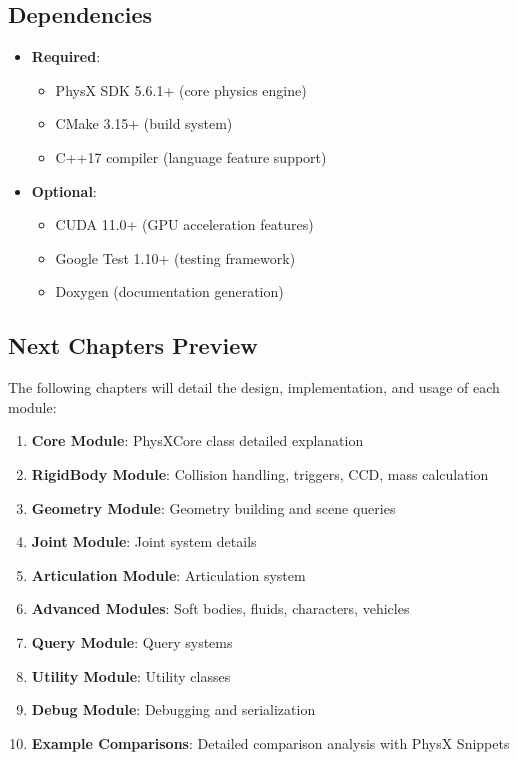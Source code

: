 \subsection{Dependencies}

\begin{itemize}
    \item \textbf{Required}:
    \begin{itemize}
        \item PhysX SDK 5.6.1+ (core physics engine)
        \item CMake 3.15+ (build system)
        \item C++17 compiler (language feature support)
    \end{itemize}

    \item \textbf{Optional}:
    \begin{itemize}
        \item CUDA 11.0+ (GPU acceleration features)
        \item Google Test 1.10+ (testing framework)
        \item Doxygen (documentation generation)
    \end{itemize}
\end{itemize}

\subsection{Next Chapters Preview}

The following chapters will detail the design, implementation, and usage of each module:

\begin{enumerate}
    \item \textbf{Core Module}: PhysXCore class detailed explanation
    \item \textbf{RigidBody Module}: Collision handling, triggers, CCD, mass calculation
    \item \textbf{Geometry Module}: Geometry building and scene queries
    \item \textbf{Joint Module}: Joint system details
    \item \textbf{Articulation Module}: Articulation system
    \item \textbf{Advanced Modules}: Soft bodies, fluids, characters, vehicles
    \item \textbf{Query Module}: Query systems
    \item \textbf{Utility Module}: Utility classes
    \item \textbf{Debug Module}: Debugging and serialization
    \item \textbf{Example Comparisons}: Detailed comparison analysis with PhysX Snippets
\end{enumerate}
